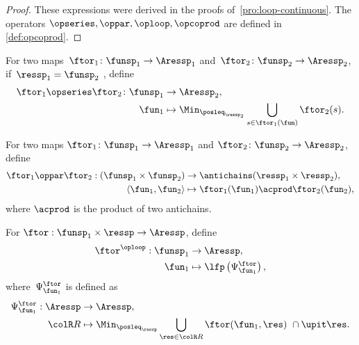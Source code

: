 \begin{proof}
These expressions were derived in the proofs of~\textendash \ref{pro:loop-continuous}.
 The operators $\opseries,\oppar,\oploop,\opcoprod$ are defined
in \textendash \ref{def:opcoprod}. 
\end{proof}
\begin{defn}
\label{def:opseries}For two maps~$\ftor_{1}\colon\funsp_{1}\rightarrow\Aressp_{1}$
and~$\ftor_{2}\colon\funsp_{2}\rightarrow\Aressp_{2}$, if~$\ressp_{1}=\funsp_{2}$
, define
\begin{align*}
{\displaystyle \ftor_{1}\opseries\ftor_{2}\colon\funsp_{1}} & \rightarrow\Aressp_{2},\\
\fun_{1} & \mapsto\Min_{\posleq_{\ressp_{2}}}\bigcup_{s\in\ftor_{1}(\fun)}\ftor_{2}(s).
\end{align*}
\end{defn}

\begin{defn}
\label{def:opmaps}For two maps $\ftor_{1}\colon\funsp_{1}\rightarrow\Aressp_{1}$
and $\ftor_{2}\colon\funsp_{2}\rightarrow\Aressp_{2}$, define
\begin{align}
\ftor_{1}\oppar\ftor_{2}:(\funsp_{1}\times\funsp_{2}) & \rightarrow\antichains(\ressp_{1}\times\ressp_{2}),\label{eq:oppar}\\
\left\langle \fun_{1},\fun_{2}\right\rangle  & \mapsto\ftor_{1}(\fun_{1})\acprod\ftor_{2}(\fun_{2}),\nonumber 
\end{align}
where $\acprod$ is the product of two antichains.
\end{defn}

\begin{defn}
\label{def:oploop}For $\ftor:\funsp_{1}\times\ressp\rightarrow\Aressp$,
define
\begin{align}
\ftor^{\oploop}:\funsp_{1} & \rightarrow\Aressp,\nonumber \\
\fun_{1} & \mapsto\lfp\left(\Psi_{\fun_{1}}^{\ftor}\right),\label{eq:lfp}
\end{align}
where~$\Psi_{\fun_{1}}^{\ftor}$ is defined as
\begin{align}
\Psi_{\fun_{1}}^{\ftor}:\Aressp & \rightarrow\Aressp,\nonumber \\
{\colR R} & \mapsto\Min_{\posleq_{\ressp}}\bigcup_{\res\in{\colR R}}\ftor(\fun_{1},\res)\ \cap\upit\res.\label{eq:phi}
\end{align}
\end{defn}

